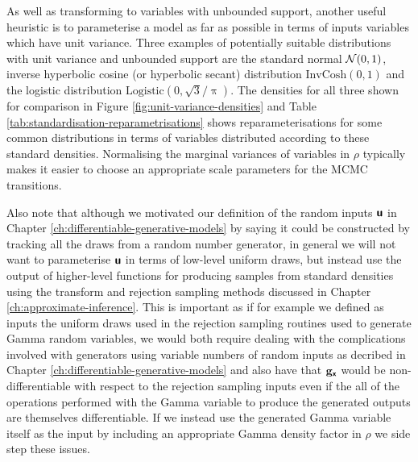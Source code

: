 As well as transforming to variables with unbounded support, another useful heuristic is to parameterise a model as far as possible in terms of inputs variables which have unit variance. Three examples of potentially suitable distributions with unit variance and unbounded support are the standard normal $\nrm{0,1}$, inverse hyperbolic cosine (or hyperbolic secant) distribution $\textrm{InvCosh}(0,1)$ and the logistic distribution $\textrm{Logistic}(0,\sqrt{3}/\uppi)$. The densities for all three shown for comparison in Figure \ref{fig:unit-variance-densities} and Table \ref{tab:standardisation-reparametrisations} shows reparameterisations for some common distributions in terms of variables distributed according to these standard densities. Normalising the marginal variances of variables in $\rho$ typically makes it easier to choose an appropriate scale parameters for the \ac{MCMC} transitions. %

Also note that although we motivated our definition of the random inputs $\boldsymbol{\mathsf{u}}$ in Chapter \ref{ch:differentiable-generative-models} by saying it could be constructed by tracking all the draws from a random number generator, in general we will not want to parameterise $\boldsymbol{\mathsf{u}}$ in terms of low-level uniform draws, but instead use the output of higher-level functions for producing samples from standard densities using the transform and rejection sampling methods discussed in Chapter \ref{ch:approximate-inference}. This is important as if for example we defined as inputs the uniform draws used in the rejection sampling routines used to generate Gamma random variables, we would both require dealing with the complications involved with generators using variable numbers of random inputs as decribed in Chapter \ref{ch:differentiable-generative-models} and also have that ${\mathbf{g}}_{\boldsymbol{\mathsf{x}}}$ would be non-differentiable with respect to the rejection sampling inputs even if the all of the operations performed with the Gamma variable to produce the generated outputs are themselves differentiable. If we instead use the generated Gamma variable itself as the input by including an appropriate Gamma density factor in $\rho$ we side step these issues. 

